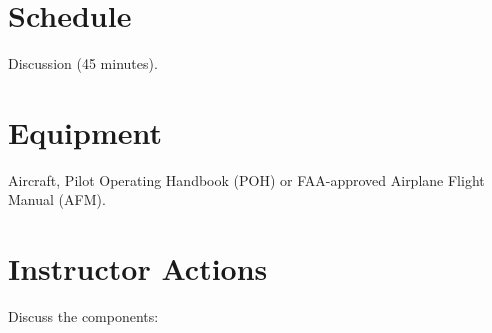 \documentclass[twoside,openright]{report}
\begin{document}
\section{Schedule}

Discussion (45 minutes).

\section{Equipment}

Aircraft, Pilot Operating Handbook (POH) or FAA-approved Airplane Flight Manual
(AFM).

\section{Instructor Actions}

Discuss the components:
\end{document}
